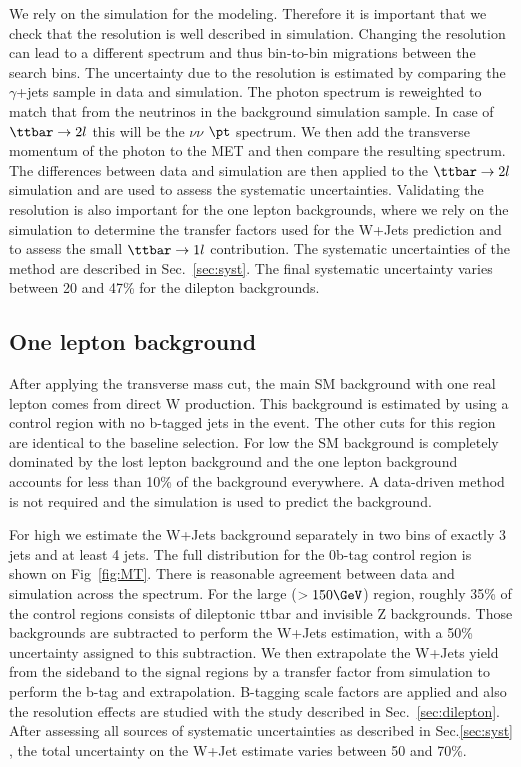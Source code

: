 We rely on the simulation for the \MET modeling.  Therefore it is important that we check that the \MET resolution is well described in simulation.  Changing the resolution can lead to a different \MET spectrum and thus bin-to-bin migrations between the search bins. The uncertainty due to the \MET resolution is estimated by comparing the $\gamma$+jets sample in data and simulation.  The photon \pt spectrum is reweighted to match that from the neutrinos in the background simulation sample.  In case of $\ttbar\rightarrow 2l$ this will be the $\nu\nu$ $\pt$ spectrum.    We then add the transverse momentum of the photon to the MET and then compare the resulting spectrum.   The differences between data and simulation are then applied to the $\ttbar\rightarrow 2l$ simulation and are used to assess the systematic uncertainties. Validating the \MET resolution is also important for the one lepton backgrounds, where we rely on the simulation to determine the transfer factors used for the W+Jets prediction and to assess the small $\ttbar\rightarrow 1l$ contribution.  The systematic uncertainties of the method are described in Sec.~\ref{sec:syst}.  The final systematic uncertainty varies between 20 and 47\% for the dilepton backgrounds.

\subsection{One lepton background}\label{sec:onelepton}
After applying the transverse mass cut, the main SM background with one real lepton comes from direct W production.  This background is estimated by using a control region with no b-tagged jets in the event.  The other cuts for this region are identical to the baseline selection. For low \MTtW the SM background is completely dominated by the lost lepton background and the one lepton background accounts for less than 10\% of the background everywhere.  A data-driven method is not required and the simulation is used to predict the background.   

For high \MTtW we estimate the W+Jets background separately in two bins of exactly 3 jets and at least 4 jets.  The full \MT distribution for the 0b-tag control region is shown on Fig~\ref{fig:MT}. There is reasonable agreement between data and simulation across the \MT spectrum.   For the large \MT ($>150 \GeV$) region, roughly 35\% of the control regions consists of dileptonic ttbar and invisible Z backgrounds.  Those backgrounds are subtracted to perform the W+Jets estimation, with a 50\% uncertainty assigned to this subtraction.   We then extrapolate the W+Jets yield from the sideband to the signal regions by a transfer factor from simulation to perform the b-tag and \MET extrapolation.  B-tagging scale factors are applied and also the \MET resolution effects are studied with the study described in Sec.~\ref{sec:dilepton}.  After assessing all sources of systematic uncertainties as described in Sec.\ref{sec:syst} , the total uncertainty on the W+Jet estimate varies  between 50 and 70\%.

